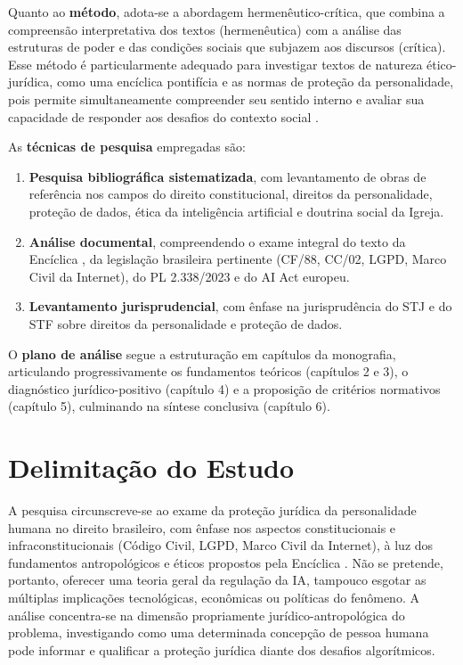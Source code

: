 Quanto ao \textbf{método}, adota-se a abordagem hermenêutico-crítica, que combina a compreensão interpretativa dos textos (hermenêutica) com a análise das estruturas de poder e das condições sociais que subjazem aos discursos (crítica). Esse método é particularmente adequado para investigar textos de natureza ético-jurídica, como uma encíclica pontifícia e as normas de proteção da personalidade, pois permite simultaneamente compreender seu sentido interno e avaliar sua capacidade de responder aos desafios do contexto social \cite{Ricoeur1990SM}.

As \textbf{técnicas de pesquisa} empregadas são:

\begin{enumerate}
    \item \textbf{Pesquisa bibliográfica sistematizada}, com levantamento de obras de referência nos campos do direito constitucional, direitos da personalidade, proteção de dados, ética da inteligência artificial e doutrina social da Igreja.
    \item \textbf{Análise documental}, compreendendo o exame integral do texto da Encíclica \MH{}, da legislação brasileira pertinente (CF/88, CC/02, LGPD, Marco Civil da Internet), do PL 2.338/2023 e do AI Act europeu.
    \item \textbf{Levantamento jurisprudencial}, com ênfase na jurisprudência do STJ e do STF sobre direitos da personalidade e proteção de dados.
\end{enumerate}

O \textbf{plano de análise} segue a estruturação em capítulos da monografia, articulando progressivamente os fundamentos teóricos (capítulos 2 e 3), o diagnóstico jurídico-positivo (capítulo 4) e a proposição de critérios normativos (capítulo 5), culminando na síntese conclusiva (capítulo 6).

\section{Delimitação do Estudo}
\label{sec:delimitacao}

A pesquisa circunscreve-se ao exame da proteção jurídica da personalidade humana no direito brasileiro, com ênfase nos aspectos constitucionais e infraconstitucionais (Código Civil, LGPD, Marco Civil da Internet), à luz dos fundamentos antropológicos e éticos propostos pela Encíclica \MH{}. Não se pretende, portanto, oferecer uma teoria geral da regulação da IA, tampouco esgotar as múltiplas implicações tecnológicas, econômicas ou políticas do fenômeno. A análise concentra-se na dimensão propriamente jurídico-antropológica do problema, investigando como uma determinada concepção de pessoa humana pode informar e qualificar a proteção jurídica diante dos desafios algorítmicos.

